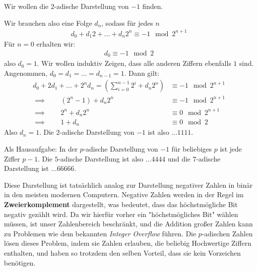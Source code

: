 \documentclass{report}
\newcommand*{\newpar}{\par\vspace{\baselineskip}\noindent}
\newcommand{\tbf}[1]{\textbf{#1}}
\begin{document}
	\begin{example}
		Wir wollen die $2$-adische Darstellung von $-1$ finden.
		\newpar
		Wir brauchen also eine Folge $d_n$, sodass für jedes $n$
		\begin{align*}
			d_0 + d_1 2 + \hdots + d_n 2^n \equiv -1 \mod 2^{n+1}
		\end{align*}
		Für $n = 0$ erhalten wir:
		\begin{align*}
			d_0 \equiv -1 \mod 2
		\end{align*}
		also $d_0 = 1$. Wir wollen induktiv Zeigen, dass alle anderen Ziffern ebenfalls $1$ sind. Angenommen, $d_0 = d_1 = \hdots = d_{n-1} = 1$. Dann gilt:
		\begin{align*}
			d_0 + 2d_1 + \hdots + 2^nd_n  = \left(\sum_{i = 0}^{n-1} 2^i + d_n 2^n\right) 
			&\equiv -1 \mod 2^{n+1}\\
			\implies \qquad (2^n - 1) + d_n 2^n &\equiv -1 \mod 2^{n+1}\\
			\implies \qquad 2^n + d_n 2^n  &\equiv 0 \mod 2^{n+1}\\
			\implies \qquad 1 + d_n &\equiv 0 \mod 2
		\end{align*}
		Also $d_n = 1$. Die $2$-adische Darstellung von $-1$ ist also $\hdots1111$.
	\end{example}
	\begin{proposition}
		Als Hausaufgabe: In der $p$-adische Darstellung von $-1$ für beliebiges $p$ ist jede Ziffer $p-1$. Die $5$-adische Darstellung ist also $\hdots4444$ und die $7$-adische Darstellung ist $\hdots66666$.
	\end{proposition}
	\noindent Diese Darstellung ist tatsächlich analog zur Darstellung negativer Zahlen in binär in den meisten modernen Computern. Negative Zahlen werden in der Regel im \tbf{Zweierkomplement} dargestellt, was bedeutet, dass das höchstmögliche Bit negativ gezählt wird. Da wir hierfür vorher ein "höchstmögliches Bit" wählen müssen, ist unser Zahlenbereich beschränkt, und die Addition großer Zahlen kann zu Problemen wie dem bekannten \textit{Integer Overflow} führen. Die $p$-adischen Zahlen lösen dieses Problem, indem sie Zahlen erlauben, die beliebig Hochwertige Ziffern enthalten, und haben so trotzdem den selben Vorteil, dass sie kein Vorzeichen benötigen.
\end{document}
